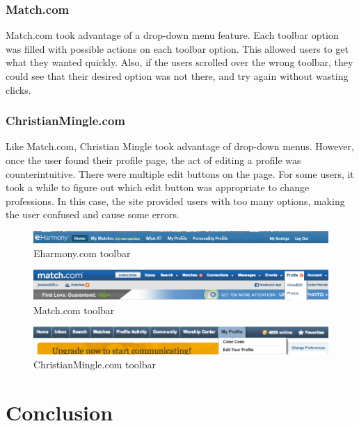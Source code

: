 \documentclass{article}
\begin{document}
\subsubsection{Match.com}
Match.com took advantage of a drop-down menu feature. Each toolbar option was filled with possible actions on each toolbar option. This allowed users to get what they wanted quickly. Also, if the users scrolled over the wrong toolbar, they could see that their desired option was not there, and try again without wasting clicks. 

\subsubsection{ChristianMingle.com}
Like Match.com, Christian Mingle took advantage of drop-down menus. However, once the user found their profile page, the act of editing a profile was counterintuitive. There were multiple edit buttons on the page. For some users, it took a while to figure out which edit button was appropriate to change professions. In this case, the site provided users with too many options, making the user confused and cause some errors. 

\begin{figure}
\centering
\includegraphics[width=7in]{Eharm3.png} 

\caption{Eharmony.com toolbar}
\label{Eharm3}
\end{figure}

\begin{figure}
\centering
\includegraphics[width=7in]{Match3.png} 

\caption{Match.com toolbar}
\label{Match3}
\end{figure}

\begin{figure}
\centering
\includegraphics[width=7in]{CM3.png} 

\caption{ChristianMingle.com toolbar}
\label{CM3}
\end{figure}

\section{Conclusion}



\pagebreak
%
%
\end{document}
